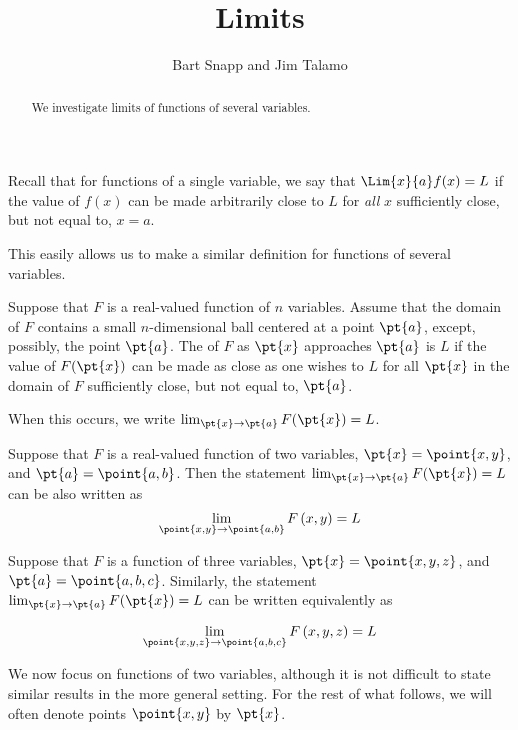 \documentclass{ximera}
\author{Bart Snapp and Jim Talamo}
\title[Dig-In:]{Limits}
\begin{document}
\begin{abstract}
We investigate limits of functions of several variables.
\end{abstract}
\maketitle

Recall that for functions of a single variable, we say that $\Lim{x}{a} f(x) = L$ if the value of $f(x)$ can be made arbitrarily close to $L$ for \emph{all} $x$ sufficiently close, but not equal to, $x=a$.

This easily allows us to make a similar definition for functions of several variables.

\begin{definition}
 Suppose that $F$ is a real-valued function of $n$ variables. Assume that the domain of $F$ contains a small $n$-dimensional ball centered at a point $\pt{a}$, except, possibly, the point $\pt{a}$.
  The  of $F$ as $\pt{x}$ approaches $\pt{a}$ is $L$ if the value of $F(\pt{x})$ can be made as close as one wishes to $L$ for all $\pt{x}$ in the domain of $F$ sufficiently close, but not equal to, $\pt{a}$.
 
 When this occurs, we write $\lim_{\pt{x}\to \pt{a}} F(\pt{x}) = L$.  
\end{definition}

 \begin{remark}   
  Suppose that $F$ is a real-valued function of two variables, $\pt{x} = \point{x,y}$, and $\pt{a} =
  \point{a,b}$. 
  Then the statement $\lim_{\pt{x}\to \pt{a}} F(\pt{x}) = L$ can be also written as
    \[
    \lim_{\point{x,y}\to \point{a,b} }F\left(x,y\right) = L
    \]
\end{remark}
  \begin{remark}
    Suppose that $F$ is a function of three variables, $\pt{x} = \point{x,y,z}$, and
    $\pt{a} = \point{a,b,c}$. Similarly, the statement  $\lim_{\pt{x}\to
      \pt{a}} F(\pt{x}) = L$ can be written equivalently as

      \[
      \lim_{\point{x,y,z}\to \point{a,b,c}} F\left(x,y,z\right) = L
      \]


\end{remark}

We now focus on functions of two variables, although it is not difficult to state similar results in the more general setting.  For the rest of what follows, we will often denote points $\point{x,y}$ by $\pt{x}$.
\end{document}
